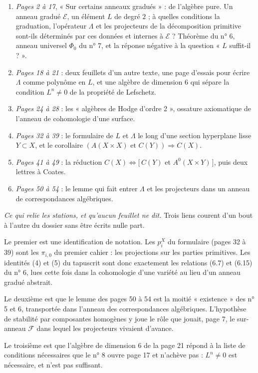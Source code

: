 \documentclass[11pt,a4paper]{article}
\begin{document}
\begin{enumerate}
  \item \emph{Pages 2 à 17}, « Sur certains anneaux gradués » : de l'algèbre
  pure. Un anneau gradué $\mathcal{E}$, un élément $L$ de degré $2$ ; à quelles
  conditions la graduation, l'opérateur $\Lambda$ et les projecteurs de la
  décomposition primitive sont-ils déterminés par ces données et internes à
  $\mathcal{E}$ ? Théorème du n° 6, anneau universel $\Phi_{0}$ du n° 7, et la
  réponse négative à la question « $L$ suffit-il ? ».
  \item \emph{Pages 18 à 21} : deux feuillets d'un autre texte, une page
  d'essais pour écrire $\Lambda$ comme polynôme en $L$, et une algèbre de
  dimension $6$ qui sépare la condition $L^{n} \neq 0$ de la propriété de
  Lefschetz.
  \item \emph{Pages 24 à 28} : les « algèbres de Hodge d'ordre 2 », ossature
  axiomatique de l'anneau de cohomologie d'une surface.
  \item \emph{Pages 32 à 39} : le formulaire de $L$ et $\Lambda$ le long d'une
  section hyperplane lisse $Y \subset X$, et le corollaire
  $(A(X \times X) \text{ et } C(Y)) \Rightarrow C(X)$.
  \item \emph{Pages 41 à 49} : la réduction $C(X) \iff [\,C(Y)$ et
  $A^{0}(X \times Y)\,]$, puis deux lettres à Coates.
  \item \emph{Pages 50 à 54} : le lemme qui fait entrer $\Lambda$ et les
  projecteurs dans un anneau de correspondances algébriques.
\end{enumerate}

\emph{Ce qui relie les stations, et qu'aucun feuillet ne dit.} Trois liens
courent d'un bout à l'autre du dossier sans être écrits nulle part.

Le premier est une identification de notation. Les $p^{X}_{i}$ du formulaire
(pages 32 à 39) sont les $\pi_{i,0}$ du premier cahier : les projections sur
les parties primitives. Les identités (4) et (5) du tapuscrit sont donc
exactement les relations (6.7) et (6.15) du n° 6, lues cette fois dans la
cohomologie d'une variété au lieu d'un anneau gradué abstrait.

Le deuxième est que le lemme des pages 50 à 54 est la moitié « existence » des
n° 5 et 6, transportée dans l'anneau des correspondances algébriques.
L'hypothèse de stabilité par composantes homogènes y joue le rôle que jouait,
page 7, le sur-anneau $\mathcal{F}$ dans lequel les projecteurs vivaient
d'avance.

Le troisième est que l'algèbre de dimension $6$ de la page 21 répond à la
liste de conditions nécessaires que le n° 8 ouvre page 17 et n'achève pas :
$L^{n} \neq 0$ est nécessaire, et n'est pas suffisant.
\end{document}
